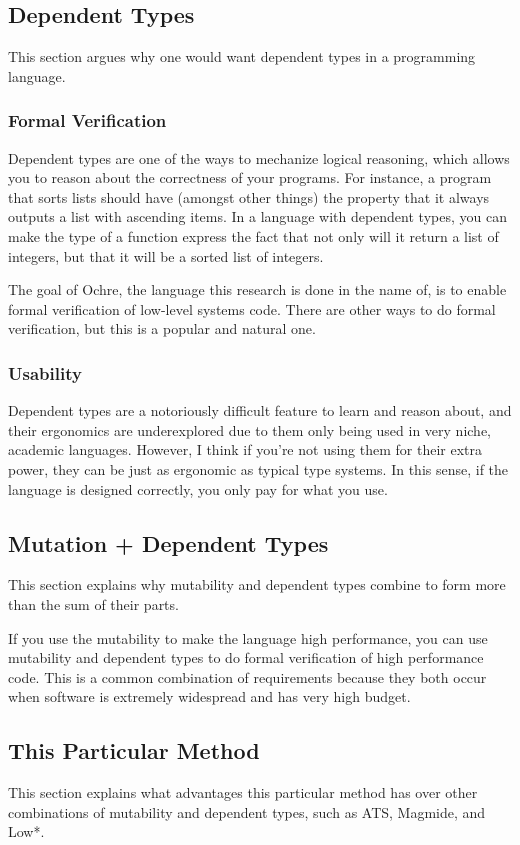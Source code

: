 \documentclass[12pt,twoside]{report}
\begin{document}
\subsection{Dependent Types}
This section argues why one would want dependent types in a programming language.

\subsubsection{Formal Verification}
Dependent types are one of the ways to mechanize logical reasoning, which allows you to reason about the correctness of your programs. For instance, a program that sorts lists should have (amongst other things) the property that it always outputs a list with ascending items. In a language with dependent types, you can make the type of a function express the fact that not only will it return a list of integers, but that it will be a sorted list of integers.

The goal of Ochre, the language this research is done in the name of, is to enable formal verification of low-level systems code. There are other ways to do formal verification, but this is a popular and natural one.

\subsubsection{Usability}
Dependent types are a notoriously difficult feature to learn and reason about, and their ergonomics are underexplored due to them only being used in very niche, academic languages. However, I think if you're not using them for their extra power, they can be just as ergonomic as typical type systems. In this sense, if the language is designed correctly, you only pay for what you use.

\subsection{Mutation + Dependent Types}
This section explains why mutability and dependent types combine to form more than the sum of their parts.

If you use the mutability to make the language high performance, you can use mutability and dependent types to do formal verification of high performance code. This is a common combination of requirements because they both occur when software is extremely widespread and has very high budget.

\subsection{This Particular Method}
This section explains what advantages this particular method has over other combinations of mutability and dependent types, such as ATS, Magmide, and Low*.
\end{document}
